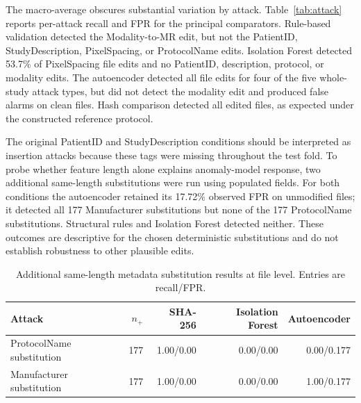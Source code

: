 \documentclass[journal]{IEEEtran}
\begin{document}
  The macro-average obscures substantial variation by attack. Table~\ref{tab:attack} reports per-attack recall and FPR for the principal comparators. Rule-based validation detected the Modality-to-MR edit, but not the PatientID, StudyDescription, PixelSpacing, or ProtocolName edits. Isolation Forest detected 53.7\% of PixelSpacing file edits and no PatientID, description, protocol, or modality edits. The autoencoder detected all file edits for four of the five whole-study attack types, but did not detect the modality edit and produced false alarms on clean files. Hash comparison detected all edited files, as expected under the constructed reference protocol.
  
  The original PatientID and StudyDescription conditions should be interpreted as insertion attacks because these tags were missing throughout the test fold. To probe whether feature length alone explains anomaly-model response, two additional same-length substitutions were run using populated fields. For both conditions the autoencoder retained its 17.72\% observed FPR on unmodified files; it detected all 177 Manufacturer substitutions but none of the 177 ProtocolName substitutions. Structural rules and Isolation Forest detected neither. These outcomes are descriptive for the chosen deterministic substitutions and do not establish robustness to other plausible edits.
  
  \begin{table}[t]
  \caption{Additional same-length metadata substitution results at file level. Entries are recall/FPR.}
  \label{tab:samelength}
  \centering\footnotesize
  \begin{tabular}{lrrrr}
  \toprule
  Attack & $n_+$ & SHA-256 & Isolation Forest & Autoencoder \\
  \midrule
  ProtocolName substitution & 177 & 1.00/0.00 & 0.00/0.00 & 0.00/0.177 \\
  Manufacturer substitution & 177 & 1.00/0.00 & 0.00/0.00 & 1.00/0.177 \\
  \bottomrule
  \end{tabular}
  \end{table}
  
\end{document}
